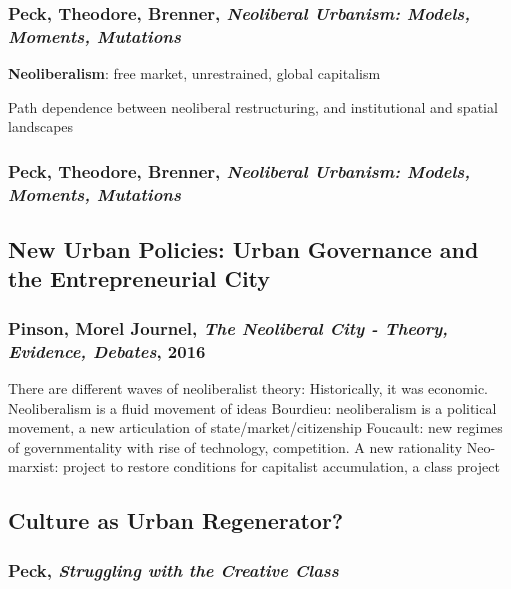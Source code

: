 \documentclass{article}
\begin{document}
\subsubsection{Peck, Theodore, Brenner, \textit{Neoliberal Urbanism: Models, Moments, Mutations}}

\textbf{Neoliberalism}: free market, unrestrained, global capitalism

\begin{outline}
	\1 Path dependence between neoliberal restructuring, and institutional and spatial landscapes
\end{outline}

\subsubsection{Peck, Theodore, Brenner, \textit{Neoliberal Urbanism: Models, Moments, Mutations}}

\subsection{New Urban Policies: Urban Governance and the Entrepreneurial City}

\subsubsection{Pinson, Morel Journel, \textit{The Neoliberal City - Theory, Evidence, Debates}, 2016}

\begin{outline}
	\1 There are different waves of neoliberalist theory:
		\2 Historically, it was economic. Neoliberalism is a fluid movement of ideas
		\2 Bourdieu: neoliberalism is a political movement, a new articulation of state/market/citizenship
		\2 Foucault: new regimes of governmentality with rise of technology, competition. A new rationality
		\2 Neo-marxist: project to restore conditions for capitalist accumulation, a class project
	\1
\end{outline}

\subsection{Culture as Urban Regenerator?}

\subsubsection{Peck, \textit{Struggling with the Creative Class}}
\end{document}

